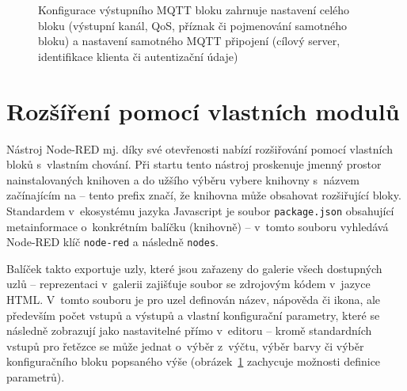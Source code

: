 \begin{figure}%
    \centering
    \qquad
    \caption{%
    Konfigurace výstupního MQTT bloku zahrnuje nastavení celého bloku (výstupní kanál, QoS, příznak 
    či pojmenování samotného bloku) a nastavení samotného MQTT připojení (cílový server, identifikace klienta či
    autentizační údaje)
    }%
    \label{fig:node-red-mqtt-out-conf}
\end{figure}


\section{Rozšíření pomocí vlastních modulů}\label{sec:node-red-rozsireni}

Nástroj Node-RED mj. díky své otevřenosti nabízí rozšiřování pomocí vlastních bloků s~vlastním
chování.
Při startu tento nástroj proskenuje jmenný prostor nainstalovaných knihoven a do užšího výběru vybere
knihovny s~názvem začínajícím na {} -- tento prefix značí, že knihovna může obsahovat
rozšiřující bloky. %
Standardem v~ekosystému jazyka Javascript je soubor \texttt{package.json} obsahující metainformace o~konkrétním
balíčku (knihovně) -- v~tomto souboru vyhledává Node-RED klíč \texttt{node-red} a následně \texttt{nodes}.

Balíček takto exportuje uzly, které jsou zařazeny do galerie všech dostupných uzlů -- reprezentaci v~galerii zajišťuje
soubor se zdrojovým kódem v~jazyce HTML.
V~tomto souboru je pro uzel definován název, nápověda či ikona, ale především počet vstupů a výstupů a vlastní
konfigurační parametry, které se následně zobrazují jako nastavitelné přímo v~editoru -- kromě standardních vstupů
pro řetězce se může jednat o~výběr z~výčtu, výběr barvy či výběr konfiguračního bloku popsaného výše
(obrázek~\ref{fig:node-red-mqtt-out-conf} zachycuje možnosti definice parametrů).

